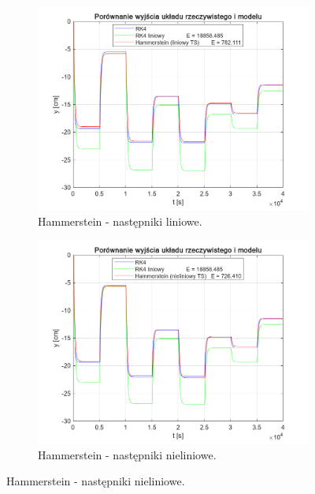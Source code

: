 \begin{figure}[b!]
\centering
\begin{subfigure}[b]{0.49\paperwidth}
\centering
\includegraphics[width=\linewidth]{pictures/HammersteinLinearModel_3}
\caption{Hammerstein - następniki liniowe.}
\end{subfigure}
\hfill
\begin{subfigure}[b]{0.49\paperwidth}
\centering
\includegraphics[width=\linewidth]{pictures/HammersteinNonlinearModel_3}
\caption{Hammerstein - następniki nieliniowe.}
\end{subfigure}
    
\vspace{0.5cm} %


\end{figure}

